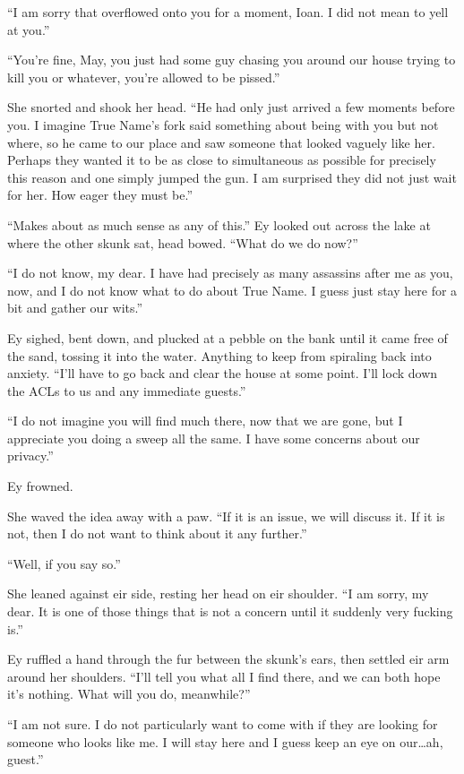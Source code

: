 ``I am sorry that overflowed onto you for a moment, Ioan. I did not mean to yell at you.''

``You're fine, May, you just had some guy chasing you around our house trying to kill you or whatever, you're allowed to be pissed.''

She snorted and shook her head. ``He had only just arrived a few moments before you. I imagine True Name's fork said something about being with you but not where, so he came to our place and saw someone that looked vaguely like her. Perhaps they wanted it to be as close to simultaneous as possible for precisely this reason and one simply jumped the gun. I am surprised they did not just wait for her. How eager they must be.''

``Makes about as much sense as any of this.'' Ey looked out across the lake at where the other skunk sat, head bowed. ``What do we do now?''

``I do not know, my dear. I have had precisely as many assassins after me as you, now, and I do not know what to do about True Name. I guess just stay here for a bit and gather our wits.''

Ey sighed, bent down, and plucked at a pebble on the bank until it came free of the sand, tossing it into the water. Anything to keep from spiraling back into anxiety. ``I'll have to go back and clear the house at some point. I'll lock down the ACLs to us and any immediate guests.''

``I do not imagine you will find much there, now that we are gone, but I appreciate you doing a sweep all the same. I have some concerns about our privacy.''

Ey frowned.

She waved the idea away with a paw. ``If it is an issue, we will discuss it. If it is not, then I do not want to think about it any further.''

``Well, if you say so.''

She leaned against eir side, resting her head on eir shoulder. ``I am sorry, my dear. It is one of those things that is not a concern until it suddenly very fucking is.''

Ey ruffled a hand through the fur between the skunk's ears, then settled eir arm around her shoulders. ``I'll tell you what all I find there, and we can both hope it's nothing. What will you do, meanwhile?''

``I am not sure. I do not particularly want to come with if they are looking for someone who looks like me. I will stay here and I guess keep an eye on our\ldots ah, guest.''


